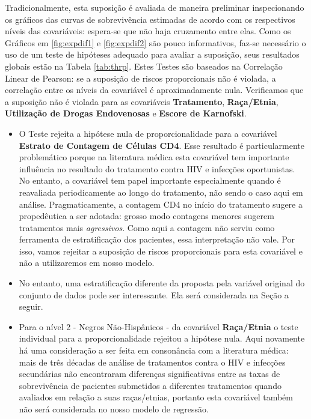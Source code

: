 \documentclass[
	12pt,				%
	openright,			%
	twoside,			%
	a4paper,			%
	english,			%
	brazil				%
	]{abntex2}
\begin{document}
Tradicionalmente, esta suposição é avaliada de maneira preliminar inspecionando os gráficos das curvas de sobrevivência estimadas de acordo com os respectivos níveis das covariáveis: espera-se que não haja cruzamento entre elas. Como os Gráficos em \ref{fig:expdif1} e \ref{fig:expdif2} são pouco informativos, faz-se necessário o uso de um teste de hipóteses adequado para avaliar a suposição, seus resultados globais estão na Tabela \ref{tab:thrp}. Estes Testes são baseados na Correlação Linear de Pearson: se a suposição de riscos proporcionais não é violada, a correlação entre os níveis da covariável é aproximadamente nula. Verificamos que a suposição não é violada para as covariáveis \textbf{Tratamento}, \textbf{Raça/Etnia}, \textbf{Utilização de Drogas Endovenosas} e \textbf{Escore de Karnofski}. 

\begin{itemize}
	\item O Teste rejeita a hipótese nula de proporcionalidade para a covariável \textbf{Estrato de Contagem de Células CD4}. Esse resultado é particularmente problemático porque na literatura médica esta covariável tem importante influência no resultado do tratamento contra HIV e infecções oportunistas. No entanto, a covariável tem papel importante especialmente quando é reavaliada periodicamente ao longo do tratamento, não sendo o caso aqui em análise. Pragmaticamente, a contagem CD4 no início do tratamento sugere a propedêutica a ser adotada: grosso modo contagens menores sugerem tratamentos mais \textit{agressivos}. Como aqui a contagem não serviu como ferramenta de estratificação dos pacientes, essa interpretação não vale. Por isso, vamos rejeitar a suposição de riscos proporcionais para esta covariável e não a utilizaremos em nosso modelo.
	\item No entanto, uma estratificação diferente da proposta pela variável original do conjunto de dados pode ser interessante. Ela será considerada na Seção a seguir.
	\item Para o nível 2 - Negros Não-Hispânicos - da covariável \textbf{Raça/Etnia} o teste individual para a proporcionalidade rejeitou a hipótese nula. Aqui novamente há uma consideração a ser feita em consonância com a literatura médica: mais de três décadas de análise de tratamentos contra o HIV e infecções secundárias não encontraram diferenças significativas entre as taxas de sobrevivência de pacientes submetidos a diferentes tratamentos quando avaliados em relação a suas raças/etnias, portanto esta covariável também não será considerada no nosso modelo de regressão.

\end{itemize}
\end{document}
